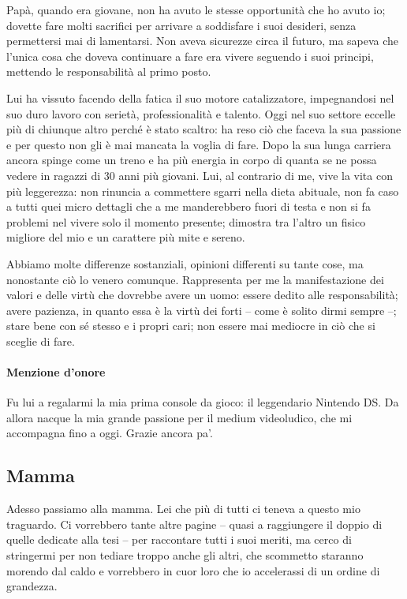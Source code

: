 Papà, quando era giovane, non ha avuto le stesse opportunità che ho
avuto io; dovette fare molti sacrifici per arrivare a soddisfare i suoi
desideri, senza permettersi mai di lamentarsi. Non aveva sicurezze
circa il futuro, ma sapeva che l'unica cosa che doveva continuare a
fare era vivere seguendo i suoi principi, mettendo le responsabilità al
primo posto.

Lui ha vissuto facendo della fatica il suo motore catalizzatore,
impegnandosi nel suo duro lavoro con serietà, professionalità e
talento. Oggi nel suo settore eccelle più di chiunque altro perché è
stato scaltro: ha reso ciò che faceva la sua passione e per questo non
gli è mai mancata la voglia di fare. Dopo la sua lunga carriera ancora
spinge come un treno e ha più energia in corpo di quanta se ne possa
vedere in ragazzi di 30 anni più giovani. Lui, al contrario di me, vive
la vita con più leggerezza: non rinuncia a commettere sgarri nella
dieta abituale, non fa caso a tutti quei micro dettagli che a me
manderebbero fuori di testa e non si fa problemi nel vivere solo il
momento presente; dimostra tra l'altro un fisico migliore del mio e un
carattere più mite e sereno.

Abbiamo molte differenze sostanziali, opinioni differenti su tante
cose, ma nonostante ciò lo venero comunque. Rappresenta per me la
manifestazione dei valori e delle virtù che dovrebbe avere un uomo:
essere dedito alle responsabilità; avere pazienza, in quanto essa è la
virtù dei forti -- come è solito dirmi sempre --; stare bene con sé
stesso e i propri cari; non essere mai mediocre in ciò che si sceglie
di fare.

\paragraph{Menzione d'onore}
Fu lui a regalarmi la mia prima console da gioco: il
leggendario Nintendo DS. Da allora nacque la mia grande passione per il
medium videoludico, che mi accompagna fino a oggi. Grazie ancora pa'.

\subsection{Mamma}
Adesso passiamo alla mamma. Lei che più di tutti ci teneva a questo mio
traguardo. Ci vorrebbero tante altre pagine -- quasi a raggiungere il
doppio di quelle dedicate alla tesi -- per raccontare tutti i suoi
meriti, ma cerco di stringermi per non tediare troppo anche gli altri,
che scommetto staranno morendo dal caldo e vorrebbero in cuor loro che
io accelerassi di un ordine di grandezza.


